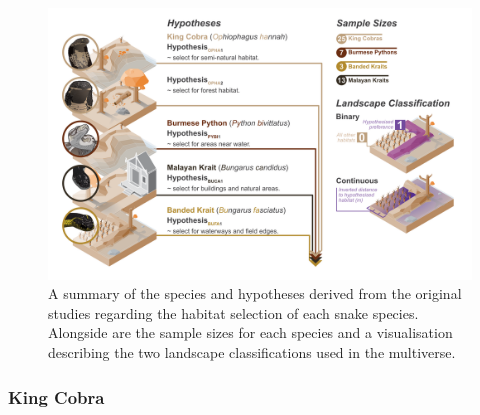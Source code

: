 \documentclass[10pt,a4paper]{article}
\begin{document}
\begin{figure}
\includegraphics[width=1\linewidth]{../ext_images/hypothesis_visual} \caption{A summary of the species and hypotheses derived from the original studies regarding the habitat selection of each snake species. Alongside are the sample sizes for each species and a visualisation describing the two landscape classifications used in the multiverse.}\label{fig:hypothesesFigure}
\end{figure}

\subsubsection{King Cobra}\label{king-cobra}
\end{document}
